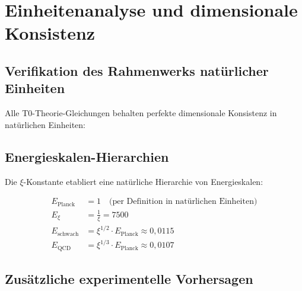 	\section{Einheitenanalyse und dimensionale Konsistenz}
	
	\subsection{Verifikation des Rahmenwerks natürlicher Einheiten}
	
	Alle T0-Theorie-Gleichungen behalten perfekte dimensionale Konsistenz in natürlichen Einheiten:
	
	\begin{table}[h]
		\centering
		\caption{Dimensionale Konsistenz in natürlichen Einheiten}
	\end{table}
	
	\subsection{Energieskalen-Hierarchien}
	
	Die $\xi$-Konstante etabliert eine natürliche Hierarchie von Energieskalen:
	
	\begin{align}
		E_{\text{Planck}} &= 1 \quad \text{(per Definition in natürlichen Einheiten)} \\
		E_\xi &= \frac{1}{\xi} = 7500 \\
		E_{\text{schwach}} &= \xi^{1/2} \cdot E_{\text{Planck}} \approx 0,0115 \\
		E_{\text{QCD}} &= \xi^{1/3} \cdot E_{\text{Planck}} \approx 0,0107
	\end{align}
	
	\subsection{Zusätzliche experimentelle Vorhersagen}
	
